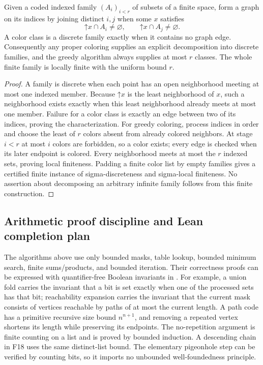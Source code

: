 \begin{theorem}\label{thm:finite-discrete-family}
Given a coded indexed family $(A_i)_{i<r}$ of subsets of a finite
space, form a graph on its indices by joining distinct $i,j$
when some $x$ satisfies
\[
 \mathord\uparrow x\cap A_i\ne\varnothing,
 \qquad
 \mathord\uparrow x\cap A_j\ne\varnothing.
\]
A color class is a discrete family exactly when it contains no
graph edge.  Consequently any proper coloring supplies an
explicit decomposition into discrete families, and the greedy
algorithm always supplies at most $r$ classes.  The whole finite
family is locally finite with the uniform bound $r$.
\end{theorem}
\begin{proof}
A family is discrete when each point has an open neighborhood
meeting at most one indexed member.  Because
$\mathord\uparrow x$ is the least neighborhood of $x$, such a
neighborhood exists exactly when this least neighborhood already
meets at most one member.  Failure for a color class is exactly
an edge between two of its indices, proving the characterization.
For greedy coloring, process indices in order and choose the
least of $r$ colors absent from already colored neighbors.
At stage $i<r$ at most $i$ colors are forbidden, so a color
exists; every edge is checked when its later endpoint is colored.
Every neighborhood meets at most the $r$ indexed sets, proving
local finiteness.  Padding a finite color list by empty families
gives a certified finite instance of sigma-discreteness and
sigma-local finiteness.  No assertion about decomposing an
arbitrary infinite family follows from this finite construction.
\end{proof}

\subsection{Arithmetic proof discipline and Lean completion plan}

The algorithms above use only bounded masks, table lookup, bounded
minimum search, finite sums/products, and bounded iteration.
Their correctness proofs can be expressed with quantifier-free
Boolean invariants in \ipra.  For example, a union fold carries
the invariant that a bit is set exactly when one of the processed
sets has that bit; reachability expansion carries the invariant
that the current mask consists of vertices reachable by paths of
at most the current length.  A path code has a primitive recursive
size bound $n^{n+1}$, and removing a repeated vertex shortens its
length while preserving its endpoints.  The no-repetition
argument is finite counting on a list and is proved by bounded
induction.  A descending chain in F18 uses the same distinct-list
bound.  The elementary pigeonhole step can be verified by counting
bits, so it imports no unbounded well-foundedness principle.

